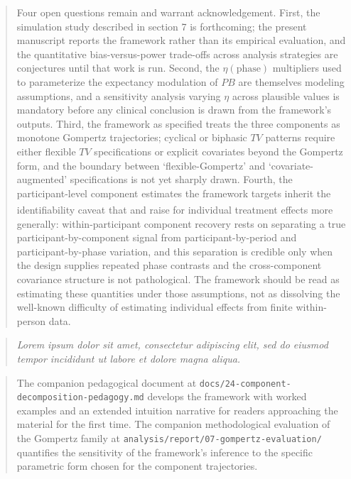 \documentclass[
  11pt,
]{article}
\newenvironment{rgt}{%
  \begin{quote}\small\itshape\color[RGB]{20,60,160}}{%
  \end{quote}}
\newenvironment{orig}{%
  \begin{quote}\normalsize\color[gray]{0.55}}{%
  \end{quote}}
\begin{document}
\begin{orig}
Four open questions remain and warrant acknowledgement. First,
the simulation study described in section 7 is forthcoming; the
present manuscript reports the framework rather than its
empirical evaluation, and the quantitative bias-versus-power
trade-offs across analysis strategies are conjectures until
that work is run. Second, the \(\eta(\text{phase})\) multipliers
used to parameterize the expectancy modulation of \(PB\) are
themselves modeling assumptions, and a sensitivity analysis
varying \(\eta\) across plausible values is mandatory before any
clinical conclusion is drawn from the framework's outputs.
Third, the framework as specified treats the three components
as monotone Gompertz trajectories; cyclical or biphasic \(TV\)
patterns require either flexible \(TV\) specifications or explicit
covariates beyond the Gompertz form, and the boundary between
`flexible-Gompertz' and `covariate-augmented' specifications is
not yet sharply drawn. Fourth, the participant-level component
estimates the framework targets inherit the identifiability
caveat that\textsuperscript{} and\textsuperscript{} raise for individual
treatment effects more generally: within-participant component
recovery rests on separating a true participant-by-component
signal from participant-by-period and participant-by-phase
variation, and this separation is credible only when the design
supplies repeated phase contrasts and the cross-component
covariance structure is not pathological. The framework should
be read as estimating these quantities under those assumptions,
not as dissolving the well-known difficulty of estimating
individual effects from finite within-person data.

\end{orig}

\begin{rgt}
Lorem ipsum dolor sit amet, consectetur adipiscing elit, sed do eiusmod tempor incididunt ut labore et dolore magna aliqua.

\end{rgt}

\begin{orig}
The companion pedagogical document at
\texttt{docs/24-component-decomposition-pedagogy.md} develops
the framework with worked examples and an extended intuition
narrative for readers approaching the material for the first
time. The companion methodological evaluation of the Gompertz
family at \texttt{analysis/report/07-gompertz-evaluation/}
quantifies the sensitivity of the framework's inference to the
specific parametric form chosen for the component trajectories.

\end{orig}
\end{document}
